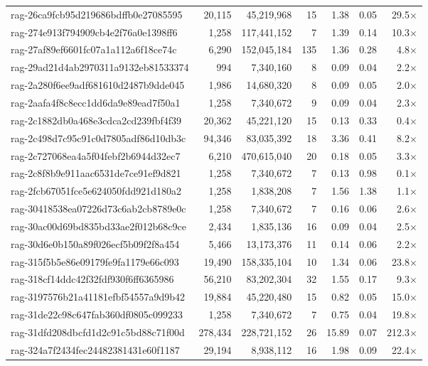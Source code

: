 \begin{table}[h!]
\begin{tabular}{lrrrrrr}
rag-26ca9fcb95d219686bdffb0e27085595 & 20,115 & 45,219,968 & 15 & 1.38 & 0.05 & 29.5$\times$ \\
rag-274e913f794909cb4e2f76a0e1398ff6 & 1,258 & 117,441,152 & 7 & 1.39 & 0.14 & 10.3$\times$ \\
rag-27af89ef6601fc07a1a112a6f18ce74c & 6,290 & 152,045,184 & 135 & 1.36 & 0.28 & 4.8$\times$ \\
rag-29ad21d4ab2970311a9132eb81533374 & 994 & 7,340,160 & 8 & 0.09 & 0.04 & 2.2$\times$ \\
rag-2a280f6ee9adf681610d2487b9dde045 & 1,986 & 14,680,320 & 8 & 0.09 & 0.05 & 2.0$\times$ \\
rag-2aafa4f8c8ecc1dd6da9e89ead7f50a1 & 1,258 & 7,340,672 & 9 & 0.09 & 0.04 & 2.3$\times$ \\
rag-2c1882db0a468e3cdca2cd239fbf4f39 & 20,362 & 45,221,120 & 15 & 0.13 & 0.33 & 0.4$\times$ \\
rag-2c498d7c95c91c0d7805adf86d10db3c & 94,346 & 83,035,392 & 18 & 3.36 & 0.41 & 8.2$\times$ \\
rag-2c727068ea4a5f04febf2b6944d32ec7 & 6,210 & 470,615,040 & 20 & 0.18 & 0.05 & 3.3$\times$ \\
rag-2c8f8b9e911aac6531de7ce91ef9d821 & 1,258 & 7,340,672 & 7 & 0.13 & 0.98 & 0.1$\times$ \\
rag-2fcb67051fce5e624050fdd921d180a2 & 1,258 & 1,838,208 & 7 & 1.56 & 1.38 & 1.1$\times$ \\
rag-30418538ea07226d73c6ab2cb8789e0c & 1,258 & 7,340,672 & 7 & 0.16 & 0.06 & 2.6$\times$ \\
rag-30ac00d69bd835bd33ae2f012b68c9ce & 2,434 & 1,835,136 & 16 & 0.09 & 0.04 & 2.5$\times$ \\
rag-30d6e0b150a89f026ecf5b09f2f8a454 & 5,466 & 13,173,376 & 11 & 0.14 & 0.06 & 2.2$\times$ \\
rag-315f5b5e86e09179fe9fa1179e66c093 & 19,490 & 158,335,104 & 10 & 1.34 & 0.06 & 23.8$\times$ \\
rag-318cf14ddc42f32fdf930f6ff6365986 & 56,210 & 83,202,304 & 32 & 1.55 & 0.17 & 9.3$\times$ \\
rag-3197576b21a41181efbf54557a9d9b42 & 19,884 & 45,220,480 & 15 & 0.82 & 0.05 & 15.0$\times$ \\
rag-31de22c98c647fab360df0805c099233 & 1,258 & 7,340,672 & 7 & 0.75 & 0.04 & 19.8$\times$ \\
rag-31dfd208dbcfd1d2c91c5bd88c71f00d & 278,434 & 228,721,152 & 26 & 15.89 & 0.07 & 212.3$\times$ \\
rag-324a7f2434fec24482381431e60f1187 & 29,194 & 8,938,112 & 16 & 1.98 & 0.09 & 22.4$\times$ \\

\end{tabular}
\end{table}

